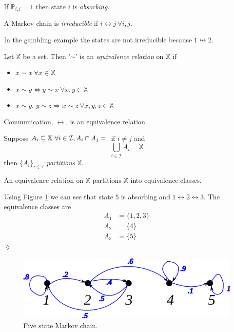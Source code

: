 \begin{definition}
\label{def:absorbing}
If $\mathbb{P}_{i,i}=1$ then state $i$ is \textit{absorbing}.
\end{definition}

\begin{definition}
A Markov chain is \textit{irreducible} if $i\leftrightarrow j ~\forall i,j$.
\end{definition}
In the gambling example the states are not irreducible because $1\nleftrightarrow 2$.

\begin{definition}
Let $\mathbb{X}$ be a set. Then '$\sim$' is an \textit{equivalence relation} on $\mathbb{X}$ if
\begin{itemize}
\item $x\sim x ~\forall x\in\mathbb{X}$
\item $x\sim y \Leftrightarrow y\sim x ~\forall x,y\in\mathbb{X}$
\item $x\sim y$, $y\sim z \Rightarrow x\sim z ~\forall x,y,z\in\mathbb{X}$
\end{itemize}
\end{definition}

\begin{theorem}
Communication, $\leftrightarrow$, is an equivalence relation.
\end{theorem}

\begin{definition}
Suppose $A_i\subseteq \mathbb{X} ~\forall i\in\mathcal{I}, A_i\cap A_j=\null$ if $i\neq j$ and
$$\bigcup_{i\in\mathcal{I}}A_i = \mathbb{X}$$
then $\{A_i\}_{i\in\mathcal{I}}$ \textit{partitions} $\mathbb{X}$.
\end{definition}

\begin{theorem}
An equivalence relation on $\mathbb{X}$ partitions $\mathbb{X}$ into equivalence classes.
\end{theorem}

\begin{example}
Using Figure \ref{fig:09mc5} we can see that state $5$ is absorbing and $1\leftrightarrow 2\leftrightarrow 3$. The equivalence classes are
\begin{align*}
A_1 &= \{1,2,3\} \\
A_2 &= \{4\} \\
A_3 &= \{5\}
\end{align*}
$\lozenge$
\end{example}

\begin{figure}[ht!]
	\centering
	\includegraphics[width=.4\textwidth]{images/09mc5}
	\caption{Five state Markov chain.}
	\label{fig:09mc5}
\end{figure}

